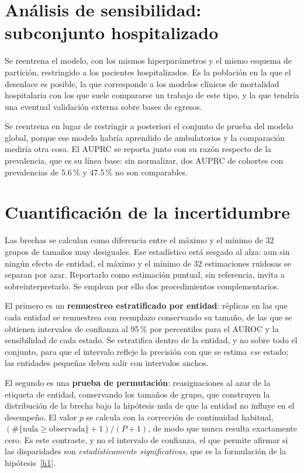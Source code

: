 \section{Análisis de sensibilidad: subconjunto hospitalizado}
\label{sec:sensibilidad}

Se reentrena el modelo, con los mismos hiperparámetros y el mismo esquema de
partición, restringido a los pacientes hospitalizados. Es la población en la que
el desenlace es posible, la que corresponde a los modelos clínicos de mortalidad
hospitalaria con los que suele compararse un trabajo de este tipo, y la que
tendría una eventual validación externa sobre bases de egresos.

Se reentrena en lugar de restringir a posteriori el conjunto de prueba del modelo
global, porque ese modelo habría aprendido de ambulatorios y la comparación
mediría otra cosa. El AUPRC se reporta junto con su razón respecto de la
prevalencia, que es su línea base: sin normalizar, dos AUPRC de cohortes con
prevalencias de 5.6\,\% y 47.5\,\% no son comparables.

\section{Cuantificación de la incertidumbre}
\label{sec:incertidumbre}

Las brechas se calculan como diferencia entre el máximo y el mínimo de 32 grupos
de tamaños muy desiguales. Ese estadístico está sesgado al alza: aun sin ningún
efecto de entidad, el máximo y el mínimo de 32 estimaciones ruidosas se separan
por azar. Reportarlo como estimación puntual, sin referencia, invita a
sobreinterpretarlo. Se emplean por ello dos procedimientos complementarios.

El primero es un \textbf{remuestreo estratificado por entidad}: \boB{} réplicas
en las que cada entidad se remuestrea con reemplazo conservando su tamaño, de las
que se obtienen intervalos de confianza al 95\,\% por percentiles para el AUROC y
la sensibilidad de cada estado. Se estratifica dentro de la entidad, y no sobre
todo el conjunto, para que el intervalo refleje la precisión con que se estima
\emph{ese} estado; las entidades pequeñas deben salir con intervalos anchos.

El segundo es una \textbf{prueba de permutación}: \boP{} reasignaciones al azar
de la etiqueta de entidad, conservando los tamaños de grupo, que construyen la
distribución de la brecha bajo la hipótesis nula de que la entidad no influye en
el desempeño. El valor $p$ se calcula con la corrección de continuidad habitual,
$(\#\{\text{nula} \ge \text{observada}\}+1)/(P+1)$, de modo que nunca resulta
exactamente cero. Es este contraste, y no el intervalo de confianza, el que
permite afirmar si las disparidades son \emph{estadísticamente significativas},
que es la formulación de la hipótesis~\ref{h1}.

